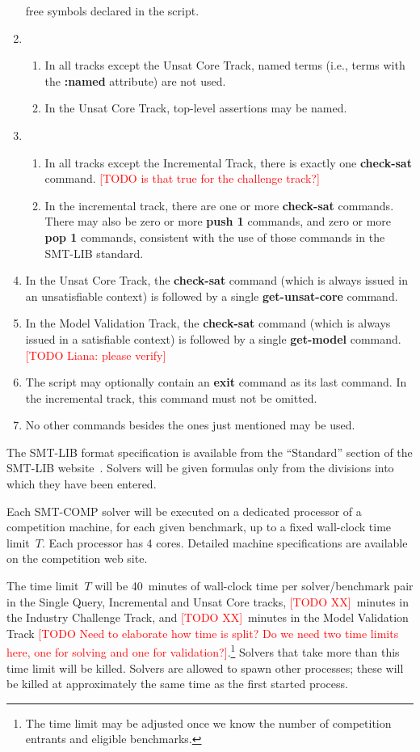 \documentclass[12pt]{article}
\newcommand{\akey}[1]{\textbf{#1}}
\newcommand{\rem}[1]{\textcolor{red}{[#1]}}
\newcommand{\todo}[1]{\rem{TODO #1}}
\newcommand{\main}{Single Query\xspace}
\newcommand{\incremental}{Incremental\xspace}
\newcommand{\ucore}{Unsat Core\xspace}
\newcommand{\mval}{Model Validation\xspace}
\newcommand{\challenge}{Industry Challenge\xspace}
\begin{document}
\begin{enumerate}
  free symbols declared in the script.
\item
  \begin{enumerate}
    \item In all tracks except the \ucore Track,  named terms (i.e., terms
      with the \akey{:named} attribute) are not used.
    \item In the \ucore Track, top-level assertions may be named.
  \end{enumerate}
\item
  \begin{enumerate}
  \item In all tracks except the \incremental Track, there is exactly one
    \akey{check-sat} command. \todo{is that true for the challenge track?}
  \item In the incremental track, there are one or more
    \akey{check-sat} commands.  There may also be zero or more
    \akey{push 1} commands, and zero or more \akey{pop 1} commands,
    consistent with the use of those commands in the SMT-LIB standard.
  \end{enumerate}
\item In the \ucore Track, the \akey{check-sat} command (which is
  always issued in an unsatisfiable context) is followed by a single
  \akey{get-unsat-core} command.
\item In the \mval Track, the \akey{check-sat} command (which is
  always issued in a satisfiable context) is followed by a single
  \akey{get-model} command. \todo{Liana: please verify}
\item The script may optionally contain an \akey{exit} command as its
  last command.  In the incremental track, this command must not be
  omitted.
\item No other commands besides the ones just mentioned may be used.
\end{enumerate}
%
The SMT-LIB format specification is available from the ``Standard''
section of the SMT-LIB website~\cite{SMT-LIB}.  Solvers will be given
formulas only from the divisions into which they have been entered.

%
Each SMT-COMP solver will be executed on a dedicated processor of a
competition machine, for each given benchmark, up to a fixed
wall-clock time limit~$T$.  Each processor has 4 cores.  Detailed
machine specifications are available on the competition web site.

The time limit~$T$ will be 40~minutes of wall-clock time per solver/benchmark
pair in the \main, \incremental and \ucore tracks, \todo{XX}~minutes in the
\challenge Track, and \todo{XX}~minutes in the \mval Track
\todo{Need to elaborate how time is split? Do we
need two time limits here, one for solving and one for
validation?}.\footnote{The time limit may be
adjusted once we know the number of competition entrants and eligible
benchmarks.}  Solvers that take more than this time limit will be killed.
Solvers are allowed to spawn other processes; these will be killed at
approximately the same time as the first started process.
\end{document}
